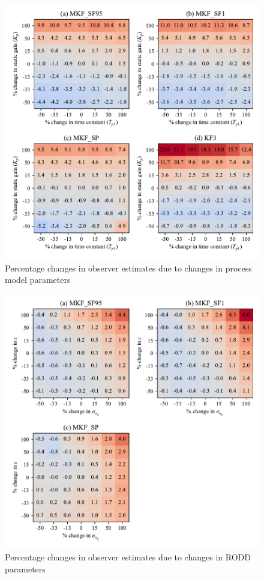 \begin{figure}[htp]
	\centering
	\includegraphics[width=15cm]{images/rod_obs_sim_sens_sys_3obs_RMSE_y_est.pdf}
	\caption{Percentage changes in observer estimates due to changes in process model parameters}
	\label{fig:rod_obs_sim_sens_model_MKF_MSE_y_est}
\end{figure}

\begin{figure}[htp]
	\centering
	\includegraphics[width=15cm]{images/rod_obs_sim_sens_rod_3obs_RMSE_y_est.pdf}
	\caption{Percentage changes in observer estimates due to changes in \gls{RODD} parameters}
	\label{fig:rod_obs_sim_sens_rod_MKF_MSE_y_est}
\end{figure}


